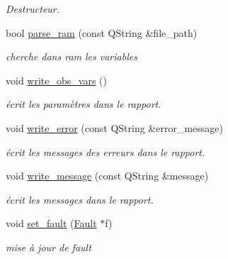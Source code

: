 \begin{DoxyCompactItemize}
\begin{DoxyCompactList}\small\item\em Destructeur. \item\end{DoxyCompactList}\item 
bool \hyperlink{classLog__creator_a452a9ccc31cb82783cd70cc6a8e6b68f}{parse\_\-ram} (const QString \&file\_\-path)
\begin{DoxyCompactList}\small\item\em cherche dans ram les variables \item\end{DoxyCompactList}\item 
void \hyperlink{classLog__creator_acc9b8ccb299f9733b4065b61c297b6e0}{write\_\-obs\_\-vars} ()
\begin{DoxyCompactList}\small\item\em écrit les paramètres dans le rapport. \item\end{DoxyCompactList}\item 
void \hyperlink{classLog__creator_a6bbc059eb7b6825439f31f00d182f8b1}{write\_\-error} (const QString \&error\_\-message)
\begin{DoxyCompactList}\small\item\em écrit les messages des erreurs dans le rapport. \item\end{DoxyCompactList}\item 
void \hyperlink{classLog__creator_a347fe83a5cd3535f5065649a16bd9ab6}{write\_\-message} (const QString \&message)
\begin{DoxyCompactList}\small\item\em écrit les messages dans le rapport. \item\end{DoxyCompactList}\item 
void \hyperlink{classLog__creator_ae12b4c588f3c5d69182e9c0433f23376}{set\_\-fault} (\hyperlink{classFault}{Fault} $\ast$f)
\begin{DoxyCompactList}\small\item\em mise à jour de fault \item\end{DoxyCompactList}\end{DoxyCompactItemize}


